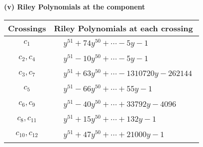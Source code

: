 \documentclass[1p]{elsarticle_modified}
\theoremstyle{definition}
\begin{document}
\flushleft \textbf{(v) Riley Polynomials at the component}\newline \\
\begin{tabular}{m{50pt}|m{274pt}}
Crossings & \hspace{64pt}Riley Polynomials at each crossing \\
\hline $$\begin{aligned}c_{1}\end{aligned}$$&$\begin{aligned}
&y^{51}+74 y^{50}+\cdots-5 y-1
\end{aligned}$\\
\hline $$\begin{aligned}c_{2},c_{4}\end{aligned}$$&$\begin{aligned}
&y^{51}-10 y^{50}+\cdots-5 y-1
\end{aligned}$\\
\hline $$\begin{aligned}c_{3},c_{7}\end{aligned}$$&$\begin{aligned}
&y^{51}+63 y^{50}+\cdots-1310720 y-262144
\end{aligned}$\\
\hline $$\begin{aligned}c_{5}\end{aligned}$$&$\begin{aligned}
&y^{51}-66 y^{50}+\cdots+55 y-1
\end{aligned}$\\
\hline $$\begin{aligned}c_{6},c_{9}\end{aligned}$$&$\begin{aligned}
&y^{51}-40 y^{50}+\cdots+33792 y-4096
\end{aligned}$\\
\hline $$\begin{aligned}c_{8},c_{11}\end{aligned}$$&$\begin{aligned}
&y^{51}+15 y^{50}+\cdots+132 y-1
\end{aligned}$\\
\hline $$\begin{aligned}c_{10},c_{12}\end{aligned}$$&$\begin{aligned}
&y^{51}+47 y^{50}+\cdots+21000 y-1
\end{aligned}$\\
\hline
\end{tabular}\\~\\
\end{document}
